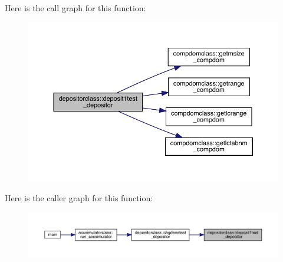 Here is the call graph for this function\+:\nopagebreak
\begin{figure}[H]
\begin{center}
\leavevmode
\includegraphics[width=350pt]{namespacedepositorclass_aaa31c3a30e6e83ab67ee89344612328c_cgraph}
\end{center}
\end{figure}
Here is the caller graph for this function\+:\nopagebreak
\begin{figure}[H]
\begin{center}
\leavevmode
\includegraphics[width=350pt]{namespacedepositorclass_aaa31c3a30e6e83ab67ee89344612328c_icgraph}
\end{center}
\end{figure}
